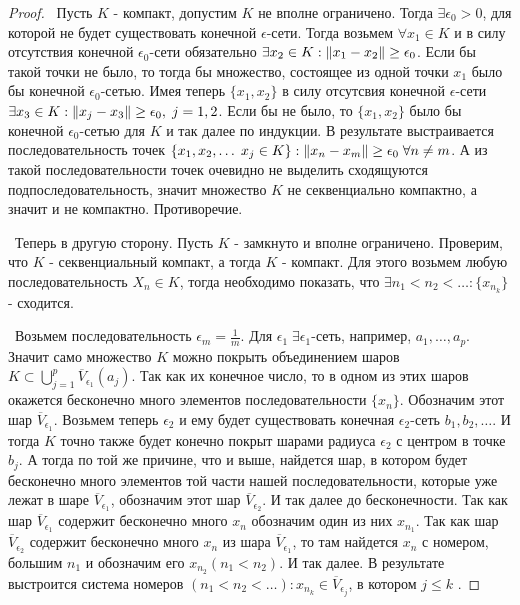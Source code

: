 \begin{proof}
\smallskip
\par\noindent\textbullet~Пусть $K$ - компакт, допустим $K$ не вполне ограничено. Тогда $\exists \epsilon_0 > 0$, для которой не будет существовать конечной 
$\epsilon$-сети. Тогда возьмем $\forall x_1 \in K$ и в силу отсутствия конечной $\epsilon_0$-сети обязательно $\exists x_2 \in K : \left\lVert x_1 - x_2\right\rVert \ge \epsilon_0$. 
Если бы такой точки не было, то тогда бы множество, состоящее из одной точки $x_1$ было бы конечной $\epsilon_0$-сетью. Имея теперь $\{ x_1, x_2\}$ в силу отсутсвия 
конечной $\epsilon$-сети $\exists x_3 \in K : \left\lVert x_j - x_3\right\rVert \ge \epsilon_0, \; j = 1, 2$. Если бы не было, то $\{ x_1, x_2\}$ было бы конечной $\epsilon_0$-сетью для $K$ 
и так далее по индукции. В результате выстраивается последовательность точек $\{x_1, x_2, \dots \; x_j \in K\} : \left\lVert x_n - x_m\right\rVert \ge \epsilon_0 \; \forall n \neq m$. А из 
такой последовательности точек очевидно не выделить сходящуются подпоследовательность, значит множество $K$ не секвенциально компактно, а значит и не компактно. 
Противоречие.

\medskip
\noindent\textbullet~Теперь в другую сторону. Пусть $K$ - замкнуто и вполне ограничено. Проверим, что $K$ - секвенциальный компакт, а тогда $K$ - компакт. Для этого возьмем 
любую последовательность $X_n \in K$, тогда необходимо показать, что $\exists n_1 < n_2 < \dots : \{ x_{n_k}\}$ - сходится.

\smallskip
\noindent\textbullet~Возьмем последовательность $\epsilon_m = \frac{1}{m}$. Для $\epsilon_1 \; \exists \epsilon_1$-сеть, например, $a_1, \dots, a_p$. Значит само множество 
$K$ можно покрыть объединением шаров $K \subset \bigcup_{j = 1}^p \overline{V}_{\epsilon_1}(a_j)$. Так как их конечное число, то в одном из этих шаров окажется бесконечно 
много элементов последовательности $\{ x_n \}$. Обозначим этот шар $\overline{V}_{\epsilon_1}$. Возьмем теперь $\epsilon_2$ и ему будет существовать конечная $\epsilon_2$-сеть $b_1, b_2, \dots$. И тогда $K$ точно также будет конечно покрыт шарами радиуса $\epsilon_2$ с центром в точке $b_j$. А тогда по той же причине, что и 
выше, найдется шар, в котором будет бесконечно много элементов той части нашей последовательности, которые уже лежат в шаре $\overline{V}_{\epsilon_1}$, обозначим этот 
шар $\overline{V}_{\epsilon_2}$. И так далее до бесконечности. Так как шар $\overline{V}_{\epsilon_1}$ содержит бесконечно много $x_n$ обозначим один из них $x_{n_1}$. 
Так как шар $\overline{V}_{\epsilon_2}$ содержит бесконечно много $x_n$ из шара $\overline{V}_{\epsilon_1}$, то там найдется $x_n$ с номером, большим ${n_1}$ и 
обозначим его $x_{n_2} (n_1 < n_2)$. И так далее. В результате выстроится система номеров $(n_1 < n_2 < \dots): x_{n_k} \in \overline{V}_{\epsilon_j}$, в котором $j \le k$
.


\end{proof}
